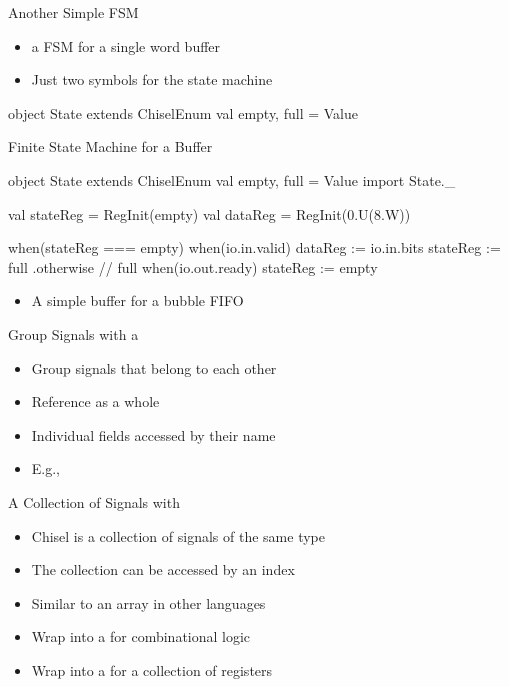 \begin{frame}[fragile]{Another Simple FSM}
\begin{itemize}
\item a FSM for a single word buffer
\item Just two symbols for the state machine
\end{itemize}
\begin{chisel}
  object State extends ChiselEnum {
    val empty, full = Value
  }
\end{chisel}
\end{frame}

\begin{frame}[fragile]{Finite State Machine for a Buffer}
\begin{chisel}
  object State extends ChiselEnum {
    val empty, full = Value
  }
  import State._

  val stateReg = RegInit(empty)
  val dataReg = RegInit(0.U(8.W))

  when(stateReg === empty) {
    when(io.in.valid) {
      dataReg := io.in.bits
      stateReg := full
    }
  } .otherwise { // full
    when(io.out.ready) {
      stateReg := empty
    }
  }
\end{chisel}
\begin{itemize}
\item A simple buffer for a bubble FIFO
\end{itemize}
\end{frame}


\begin{frame}[fragile]{Group Signals with a }
\begin{itemize}
\item Group signals that belong to each other
\item Reference as a whole
\item Individual fields accessed by their name
\item E.g., 
\end{itemize}
\end{frame}

\begin{frame}[fragile]{A Collection of Signals with }
\begin{itemize}
\item Chisel  is a collection of signals of the same type
\item The collection can be accessed by an index
\item Similar to an array in other languages
\item Wrap into a  for combinational logic
\item Wrap into a  for a collection of registers
\end{itemize}
\end{frame}

